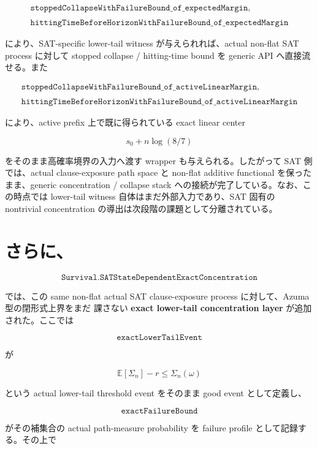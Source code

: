 \documentclass[12pt,a4paper]{article}
\begin{document}
\[
\begin{aligned}
\texttt{stoppedCollapseWithFailureBound\_of\_expectedMargin}, \\
\qquad \\
\texttt{hittingTimeBeforeHorizonWithFailureBound\_of\_expectedMargin}
\end{aligned}
\]

により、SAT-specific lower-tail witness が与えられれば、actual non-flat SAT process に対して stopped collapse / hitting-time bound を generic API へ直接流せる。また

\[
\begin{aligned}
\texttt{stoppedCollapseWithFailureBound\_of\_activeLinearMargin}, \\
\qquad \\
\texttt{hittingTimeBeforeHorizonWithFailureBound\_of\_activeLinearMargin}
\end{aligned}
\]

により、active prefix 上で既に得られている exact linear center

\[
s_0 + n\log(8/7)
\]

をそのまま高確率境界の入力へ渡す wrapper も与えられる。したがって SAT 側では、actual clause-exposure path space と non-flat additive functional を保ったまま、generic concentration / collapse stack への接続が完了している。なお、この時点では lower-tail witness 自体はまだ外部入力であり、SAT 固有の nontrivial concentration の導出は次段階の課題として分離されている。

\section{さらに、}\label{ux3055ux3089ux306b-19}

\[
\texttt{Survival.SATStateDependentExactConcentration}
\]

では、この same non-flat actual SAT clause-exposure process に対して、Azuma 型の閉形式上界をまだ 課さない \textbf{exact lower-tail concentration layer} が追加された。ここでは

\[
\texttt{exactLowerTailEvent}
\]

が

\[
\mathbb E[\Sigma_{n}]-r \le \Sigma_{n}(\omega)
\]

という actual lower-tail threshold event をそのまま good event として定義し、

\[
\texttt{exactFailureBound}
\]

がその補集合の actual path-measure probability を failure profile として記録する。その上で
\end{document}
